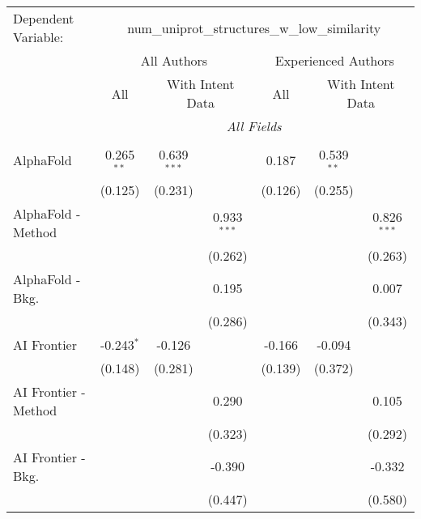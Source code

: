 \begingroup
\centering
\begin{tabular}{lcccccc}
   \tabularnewline \midrule \midrule
   Dependent Variable: & \multicolumn{6}{c}{num\_uniprot\_structures\_w\_low\_similarity}\\
 & \multicolumn{3}{c}{All Authors} & \multicolumn{3}{c}{Experienced Authors} \\
\cmidrule(lr){2-4} \cmidrule(lr){5-7}
 & \multicolumn{1}{c}{All} & \multicolumn{2}{c}{With Intent Data} & \multicolumn{1}{c}{All} & \multicolumn{2}{c}{With Intent Data} \\
\cmidrule(lr){2-2} \cmidrule(lr){3-4} \cmidrule(lr){5-5} \cmidrule(lr){6-7}
 & \multicolumn{6}{c}{\textit{All Fields}} \\ \\
   AlphaFold            & 0.265$^{**}$   & 0.639$^{***}$ &               & 0.187          & 0.539$^{**}$  &   \\   
                        & (0.125)        & (0.231)       &               & (0.126)        & (0.255)       &   \\   
   AlphaFold - Method   &                &               & 0.933$^{***}$ &                &               & 0.826$^{***}$\\   
                        &                &               & (0.262)       &                &               & (0.263)\\   
   AlphaFold - Bkg.     &                &               & 0.195         &                &               & 0.007\\   
                        &                &               & (0.286)       &                &               & (0.343)\\   
   AI Frontier          & -0.243$^{*}$   & -0.126        &               & -0.166         & -0.094        &   \\   
                        & (0.148)        & (0.281)       &               & (0.139)        & (0.372)       &   \\   
   AI Frontier - Method &                &               & 0.290         &                &               & 0.105\\   
                        &                &               & (0.323)       &                &               & (0.292)\\   
   AI Frontier - Bkg.   &                &               & -0.390        &                &               & -0.332\\   
                        &                &               & (0.447)       &                &               & (0.580)\\   

\end{tabular}
